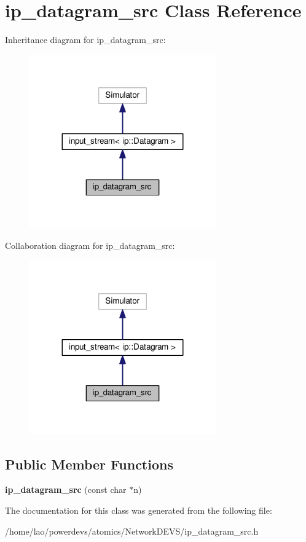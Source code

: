 \hypertarget{classip__datagram__src}{}\section{ip\+\_\+datagram\+\_\+src Class Reference}
\label{classip__datagram__src}


Inheritance diagram for ip\+\_\+datagram\+\_\+src\+:
\nopagebreak
\begin{figure}[H]
\begin{center}
\leavevmode
\includegraphics[width=227pt]{classip__datagram__src__inherit__graph}
\end{center}
\end{figure}


Collaboration diagram for ip\+\_\+datagram\+\_\+src\+:
\nopagebreak
\begin{figure}[H]
\begin{center}
\leavevmode
\includegraphics[width=227pt]{classip__datagram__src__coll__graph}
\end{center}
\end{figure}
\subsection*{Public Member Functions}
\begin{DoxyCompactItemize}
\item 
{\bfseries ip\+\_\+datagram\+\_\+src} (const char $\ast$n)\hypertarget{classip__datagram__src_a06b73f2700abc04cf41be7e0872e134e}{}\label{classip__datagram__src_a06b73f2700abc04cf41be7e0872e134e}

\end{DoxyCompactItemize}


The documentation for this class was generated from the following file\+:\begin{DoxyCompactItemize}
\item 
/home/lao/powerdevs/atomics/\+Network\+D\+E\+V\+S/ip\+\_\+datagram\+\_\+src.\+h\end{DoxyCompactItemize}
